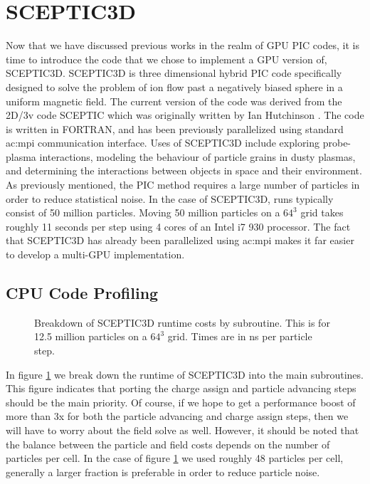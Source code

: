 		

	\section{SCEPTIC3D}
Now that we have discussed previous works in the realm of GPU PIC codes, it is time to introduce the code that we chose to implement a GPU version of, SCEPTIC3D. SCEPTIC3D is three dimensional hybrid PIC code specifically designed to solve the problem of ion flow past a negatively biased sphere in a uniform magnetic field. The current version of the code was derived from the 2D/3v code SCEPTIC which was originally written by Ian Hutchinson \cite{Hutchinson2002,Hutchinson2003,Hutchinson2005,Hutchinson2006}. The code is written in FORTRAN, and has been previously parallelized using standard \gls{ac:mpi} communication interface. Uses of SCEPTIC3D include exploring probe-plasma interactions, modeling the behaviour of particle grains in dusty plasmas, and determining the interactions between objects in space and their environment. As previously mentioned, the PIC method requires a large number of particles in order to reduce statistical noise. In the case of SCEPTIC3D, runs typically consist of 50 million particles.
Moving 50 million particles on a $64^3$ grid takes roughly 11 seconds per step using 4 cores of an Intel i7 930 processor. The fact that SCEPTIC3D has already been parallelized using \gls{ac:mpi} makes it far easier to develop a multi-GPU implementation. 

	\subsection{CPU Code Profiling}


\begin{figure}
\begin{center}

\end{center}
\caption[Breakdown of SCEPTIC3D runtime costs]{Breakdown of SCEPTIC3D runtime costs by subroutine. This is for 12.5 million particles on a $64^3$ grid. Times are in ns per particle step.}
\label{fig:sceptic3D_profile}
\end{figure}

In figure \ref{fig:sceptic3D_profile} we break down the runtime of SCEPTIC3D into the main subroutines. This figure indicates that porting the charge assign and particle advancing steps should be the main priority. Of course, if we hope to get a performance boost of more than 3x for both the particle advancing and charge assign steps, then we will have to worry about the field solve as well. However, it should be noted that the balance between the particle and field costs depends on the number of particles per cell. In the case of figure \ref{fig:sceptic3D_profile} we used roughly 48 particles per cell, generally a larger fraction is preferable in order to reduce particle noise. 

